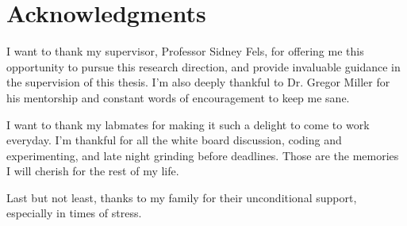 
\chapter{Acknowledgments}

I want to thank my supervisor, Professor Sidney Fels, for offering me this opportunity to pursue this research direction, and provide invaluable guidance in the supervision of this thesis. I'm also deeply thankful to Dr. Gregor Miller for his mentorship and constant words of encouragement to keep me sane.

I want to thank my labmates for making it such a delight to come to work everyday. I'm thankful for all the white board discussion, coding and experimenting, and late night grinding before deadlines. Those are the memories I will cherish for the rest of my life.

Last but not least, thanks to my family for their unconditional support, especially in times of stress.